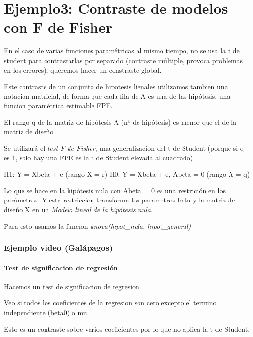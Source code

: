 \documentclass[
]{article}
\begin{document}
\hypertarget{ejemplo3-contraste-de-modelos-con-f-de-fisher}{%
\section{Ejemplo3: Contraste de modelos con F de
Fisher}\label{ejemplo3-contraste-de-modelos-con-f-de-fisher}}

En el caso de varias funciones paramétricas al mismo tiempo, no se usa
la t de student para contrastarlas por separado (contraste múltiple,
provoca problemas en los errores), queremos hacer un constraste global.

Este contraste de un conjunto de hipotesis lienales utilizamos tambien
una notacion matricial, de forma que cada fila de A es una de las
hipótesis, una funcion paramétrica estimable FPE.

El rango q de la matriz de hipótesis A (nº de hipótesis) es menor que el
de la matriz de diseño

Se utilizará el \emph{test F de Fisher}, una generalizacion del t de
Student (porque si q es 1, solo hay una FPE es la t de Student elevada
al cuadrado)

H1: Y = Xbeta + e (rango X = r) H0: Y = Xbeta + e, Abeta = 0 (rango A =
q)

Lo que se hace en la hipótesis nula con Abeta = 0 es una restrición en
los parámetros. Y esta restriccion transforma los parametros beta y la
matriz de diseño X en un \emph{Modelo lineal de la hipótesis nula}.

Para esto usamos la funcion \emph{anova(hipot\_nula, hipot\_general)}

\hypertarget{ejemplo-video-galuxe1pagos}{%
\subsubsection{Ejemplo video
(Galápagos)}\label{ejemplo-video-galuxe1pagos}}

\hypertarget{test-de-significacion-de-regresiuxf3n}{%
\paragraph{Test de significacion de
regresión}\label{test-de-significacion-de-regresiuxf3n}}

Hacemos un test de significacion de regresion.

Veo si todos los coeficientes de la regresion son cero excepto el
termino independiente (beta0) o mu.

Esto es un contraste sobre varios coeficientes por lo que no aplica la t
de Student.
\end{document}
